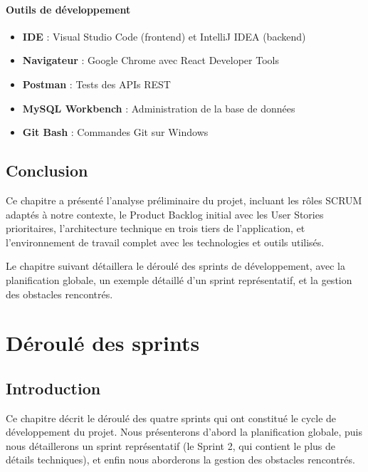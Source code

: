 \documentclass[12pt,a4paper]{report}
\begin{document}
\subsubsection{Outils de développement}

\begin{itemize}[leftmargin=1cm]
    \item \textbf{IDE} : Visual Studio Code (frontend) et IntelliJ IDEA (backend)
    \item \textbf{Navigateur} : Google Chrome avec React Developer Tools
    \item \textbf{Postman} : Tests des APIs REST
    \item \textbf{MySQL Workbench} : Administration de la base de données
    \item \textbf{Git Bash} : Commandes Git sur Windows
\end{itemize}

\section*{Conclusion}

Ce chapitre a présenté l'analyse préliminaire du projet, incluant les rôles SCRUM adaptés à notre contexte, le Product Backlog initial avec les User Stories prioritaires, l'architecture technique en trois tiers de l'application, et l'environnement de travail complet avec les technologies et outils utilisés.

Le chapitre suivant détaillera le déroulé des sprints de développement, avec la planification globale, un exemple détaillé d'un sprint représentatif, et la gestion des obstacles rencontrés.


\chapter{Déroulé des sprints}

\section*{Introduction}

Ce chapitre décrit le déroulé des quatre sprints qui ont constitué le cycle de développement du projet. Nous présenterons d'abord la planification globale, puis nous détaillerons un sprint représentatif (le Sprint 2, qui contient le plus de détails techniques), et enfin nous aborderons la gestion des obstacles rencontrés.
\end{document}
